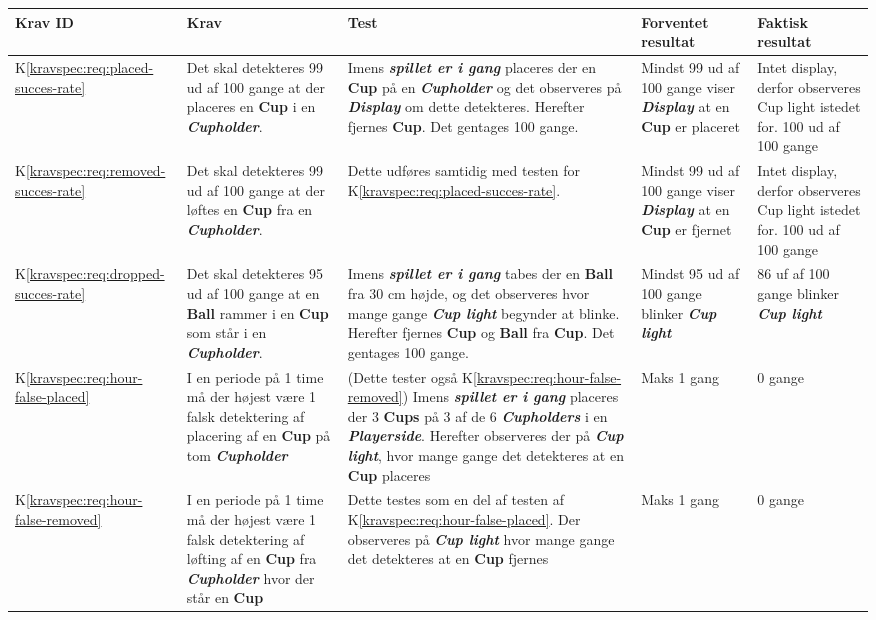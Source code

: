 \documentclass[Accepttestspecifikation/Accepttest_Main.tex]{subfiles}
\begin{document}
\begin{longtable}{|L{0.08\textwidth}|L{0.3\textwidth}|L{0.3\textwidth}|L{0.2\textwidth}|L{0.2\textwidth}|}
\hline
\textbf{Krav ID} & \textbf{Krav} & \textbf{Test} & \textbf{Forventet resultat} & \textbf{Faktisk resultat} \\ \hline

K\ref{kravspec:req:placed-succes-rate} & Det skal detekteres 99 ud af 100 gange at der placeres en \textbf{Cup} i en \textit{\textbf{Cupholder}}. & Imens \textbf{\textit{spillet er i gang}} placeres der en \textbf{Cup} på en \textbf{\textit{Cupholder}} og det observeres på \textbf{\textit{Display}} om dette detekteres. Herefter fjernes \textbf{Cup}. Det gentages 100 gange. & Mindst 99 ud af 100 gange viser \textbf{\textit{Display}} at en \textbf{Cup} er placeret & Intet display, derfor observeres Cup light istedet for. 100 ud af 100 gange\\ \hline
K\ref{kravspec:req:removed-succes-rate} & Det skal detekteres 99 ud af 100 gange at der løftes en \textbf{Cup} fra en \textit{\textbf{Cupholder}}. & Dette udføres samtidig med testen for K\ref{kravspec:req:placed-succes-rate}. & Mindst 99 ud af 100 gange viser \textbf{\textit{Display}} at en \textbf{Cup} er fjernet & Intet display, derfor observeres Cup light istedet for. 100 ud af 100 gange\\ \hline
K\ref{kravspec:req:dropped-succes-rate} & Det skal detekteres 95 ud af 100 gange at en \textbf{Ball} rammer i  en \textbf{Cup} som står i en \textit{\textbf{Cupholder}}. & Imens \textbf{\textit{spillet er i gang}} tabes der en \textbf{Ball} fra 30 cm højde, og det observeres hvor mange gange \textbf{\textit{Cup light}} begynder at blinke. Herefter fjernes \textbf{Cup} og \textbf{Ball} fra \textbf{Cup}. Det gentages 100 gange. & Mindst 95 ud af 100 gange blinker \textbf{\textit{Cup light}} & 86 uf af 100 gange blinker \textbf{\textit{Cup light}}\\ \hline
K\ref{kravspec:req:hour-false-placed} & I en periode på 1 time må der højest være 1 falsk detektering af placering af en \textbf{Cup} på tom \textit{\textbf{Cupholder}} & (Dette tester også K\ref{kravspec:req:hour-false-removed}) Imens \textbf{\textit{spillet er i gang}} placeres der 3 \textbf{Cups} på 3 af de 6 \textbf{\textit{Cupholders}} i en \textbf{\textit{Playerside}}. Herefter observeres der på \textbf{\textit{Cup light}}, hvor mange gange det detekteres at en \textbf{Cup} placeres & Maks 1 gang & 0 gange \\ \hline

K\ref{kravspec:req:hour-false-removed}& I en periode på 1 time må der højest være 1 falsk detektering af løfting af en \textbf{Cup} fra \textit{\textbf{Cupholder}} hvor der står en \textbf{Cup}& Dette testes som en del af testen af K\ref{kravspec:req:hour-false-placed}. Der observeres på \textbf{\textit{Cup light}} hvor mange gange det detekteres at en \textbf{Cup} fjernes & Maks 1 gang & 0 gange\\ \hline


\end{longtable}
\end{document}
